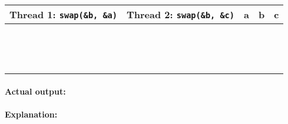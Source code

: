 \documentclass[12pt]{article}
\begin{document}
\begin{center}
\begin{tabular}{l|l|l|l|l}
  {\bf Thread 1: \verb+swap(&b, &a)+} & {\bf Thread 2: \verb+swap(&b, &c)+} & {\bf a} &{\bf b } & {\bf c} \\ \hline
  &&&& \\ \hline
  &&&& \\ \hline
  &&&& \\ \hline
  &&&& \\ \hline
  &&&& \\ \hline
  &&&& \\ \hline
  &&&& \\ \hline
  &&&& \\ \hline
  &&&& \\ \hline
  &&&& \\ \hline
  &&&& \\ \hline
  &&&& \\ \hline
  &&&& \\ \hline
  &&&& \\ \hline
\end{tabular}
\end{center}

\paragraph{Actual output:}

\paragraph{Explanation:}
\end{document}
